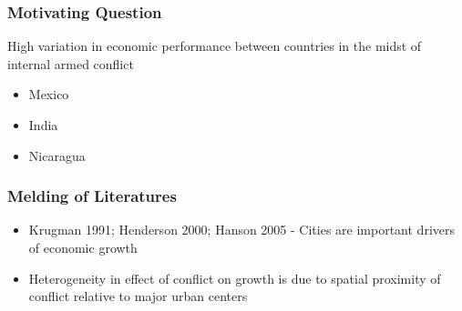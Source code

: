 
\begin{frame}
\frametitle{Motivating Question}

High variation in economic performance between countries in the midst of internal armed conflict

\begin{itemize}
\item Mexico
\item India
\item Nicaragua
\end{itemize}


\end{frame}

\begin{frame}
\frametitle{Melding of Literatures}

\pause
\begin{itemize}
\item Krugman 1991; Henderson 2000; Hanson 2005 - Cities are important drivers of economic growth
\pause
\item Heterogeneity in effect of conflict on growth is due to spatial proximity of conflict relative to major urban centers
\end{itemize}

\end{frame}

